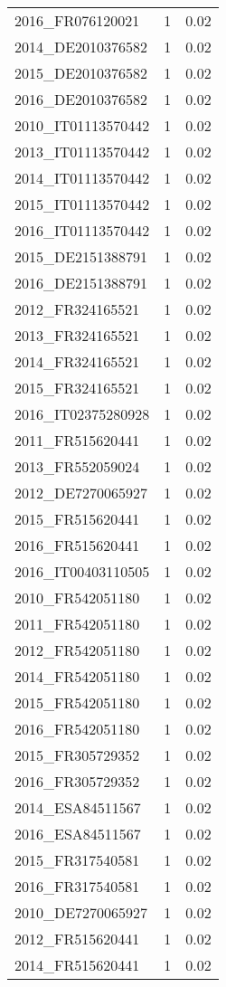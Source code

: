 \begin{table*}[htbp]
\begin{tabular}{lrr}
2016_FR076120021 & 1 & 0.02 \\
2014_DE2010376582 & 1 & 0.02 \\
2015_DE2010376582 & 1 & 0.02 \\
2016_DE2010376582 & 1 & 0.02 \\
2010_IT01113570442 & 1 & 0.02 \\
2013_IT01113570442 & 1 & 0.02 \\
2014_IT01113570442 & 1 & 0.02 \\
2015_IT01113570442 & 1 & 0.02 \\
2016_IT01113570442 & 1 & 0.02 \\
2015_DE2151388791 & 1 & 0.02 \\
2016_DE2151388791 & 1 & 0.02 \\
2012_FR324165521 & 1 & 0.02 \\
2013_FR324165521 & 1 & 0.02 \\
2014_FR324165521 & 1 & 0.02 \\
2015_FR324165521 & 1 & 0.02 \\
2016_IT02375280928 & 1 & 0.02 \\
2011_FR515620441 & 1 & 0.02 \\
2013_FR552059024 & 1 & 0.02 \\
2012_DE7270065927 & 1 & 0.02 \\
2015_FR515620441 & 1 & 0.02 \\
2016_FR515620441 & 1 & 0.02 \\
2016_IT00403110505 & 1 & 0.02 \\
2010_FR542051180 & 1 & 0.02 \\
2011_FR542051180 & 1 & 0.02 \\
2012_FR542051180 & 1 & 0.02 \\
2014_FR542051180 & 1 & 0.02 \\
2015_FR542051180 & 1 & 0.02 \\
2016_FR542051180 & 1 & 0.02 \\
2015_FR305729352 & 1 & 0.02 \\
2016_FR305729352 & 1 & 0.02 \\
2014_ESA84511567 & 1 & 0.02 \\
2016_ESA84511567 & 1 & 0.02 \\
2015_FR317540581 & 1 & 0.02 \\
2016_FR317540581 & 1 & 0.02 \\
2010_DE7270065927 & 1 & 0.02 \\
2012_FR515620441 & 1 & 0.02 \\
2014_FR515620441 & 1 & 0.02 \\

\end{tabular}
\end{table*}
